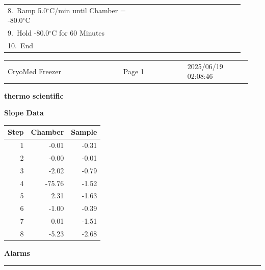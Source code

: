 \documentclass[UTF8,10pt,a4paper,fontset=fandol]{ctexart}
\newcommand{\fieldvalue}[1]{#1}
\begin{document}
\begin{flushleft}
\begin{tabular}{@{}p{0.49\linewidth}p{0.43\linewidth}@{}}
8.\ Ramp
\fieldvalue{5.0$^\circ$C/min}
until Chamber =
\fieldvalue{-80.0$^\circ$C}
& \\

9.\ Hold
\fieldvalue{-80.0$^\circ$C}
for
\fieldvalue{60 Minutes}
& \\

10.\ End & 
\end{tabular}

\vfill

\noindent
\begin{tabular}{@{}p{0.45\linewidth}p{0.25\linewidth}p{0.25\linewidth}@{}}
CryoMed Freezer & Page 1 & 2025/06/19 02:08:46
\end{tabular}
\end{flushleft}

\newpage

\begin{flushright}
\textsf{\textbf{thermo scientific}}
\end{flushright}

\noindent
\begin{minipage}[t]{0.38\linewidth}
\textbf{Slope Data}

\vspace{0.05in}
\begin{tabular}{r r r}
\hline
Step & Chamber & Sample \\
\hline
1 & -0.01 & -0.31 \\
2 & -0.00 & -0.01 \\
3 & -2.02 & -0.79 \\
4 & -75.76 & -1.52 \\
5 & 2.31 & -1.63 \\
6 & -1.00 & -0.39 \\
7 & 0.01 & -1.51 \\
8 & -5.23 & -2.68 \\
\end{tabular}
\end{minipage}
\hfill
\begin{minipage}[t]{0.52\linewidth}
\textbf{Alarms}

\vspace{0.12in}
\noindent\rule{\linewidth}{0.4pt}
\end{minipage}
\end{document}
